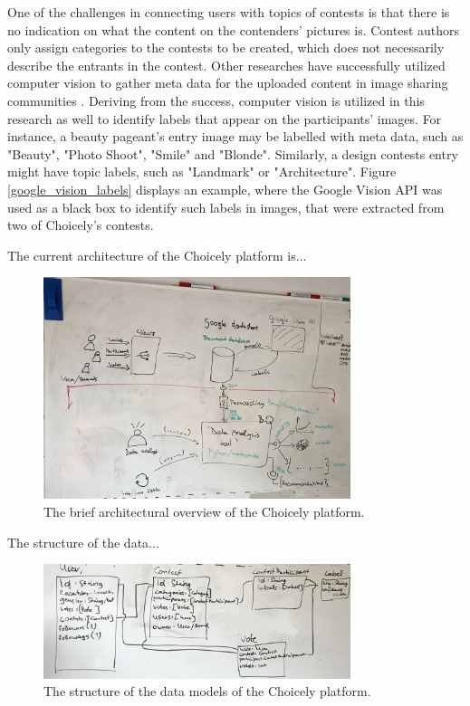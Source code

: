     One of the challenges in connecting users with topics of contests is that there is no indication on what the content on the contenders' pictures is. Contest authors only assign categories to the contests to be created, which does not necessarily describe the entrants in the contest. Other researches have successfully utilized computer vision to gather meta data for the uploaded content in image sharing communities \cite{bakhshi2014faces, hu2014we}. Deriving from the success, computer vision is utilized in this research as well to identify labels that appear on the participants' images. For instance, a beauty pageant's entry image may be labelled with meta data, such as "Beauty", "Photo Shoot", "Smile" and "Blonde". Similarly, a design contests entry might have topic labels, such as "Landmark" or "Architecture". Figure \ref{google_vision_labels} displays an example, where the Google Vision API was used as a black box to identify such labels in images, that were extracted from two of Choicely's contests.
    
    The current architecture of the Choicely platform is...
    \begin{figure}[h] 
		\begin{center}
            \includegraphics[width=0.8\textwidth]{Images/architecture_whiteboard.jpg}
			\caption{The brief architectural overview of the Choicely platform.}
			\label{choicely_architecture}
		\end{center}
    \end{figure}

    The structure of the data... 
    \begin{figure}[h] 
		\begin{center}
            \includegraphics[width=0.8\textwidth]{Images/data_structure_whiteboard.jpg}
			\caption{The structure of the data models of the Choicely platform.}
			\label{choicely_data_models}
		\end{center}
    \end{figure}

